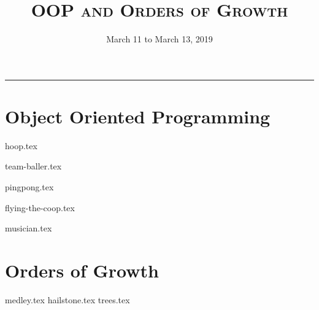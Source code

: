 \documentclass{exam}
\title{\textsc{OOP and Orders of Growth}}
\date{March 11 to March 13, 2019}
\begin{document}
\maketitle
\rule{\textwidth}{0.15em}
\fontsize{12}{15}\selectfont

\section{Object Oriented Programming}
\begin{questions}
{hoop.tex}

{team-baller.tex}

{pingpong.tex}

{flying-the-coop.tex}

{musician.tex}

\end{questions}

\newpage
\section{Orders of Growth}
\begin{questions}
{medley.tex}
{hailstone.tex}
{trees.tex}
\end{questions}
\end{document}
